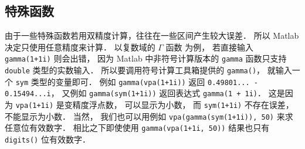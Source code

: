 \subsection{特殊函数}
由于一些特殊函数若用双精度计算，往往在一些区间产生较大误差． 所以 Matlab 决定只使用任意精度来计算． 以复数域的 $\Gamma$ 函数 为例， 若直接输入 \verb|gamma(1+1i)| 则会出错， 因为 Matlab 中非符号计算版本的 \verb|gamma| 函数只支持 \verb|double| 类型的实数输入． 所以要调用符号计算工具箱提供的 \verb|gamma()|， 就输入一个 \verb|sym| 类型的变量即可． 例如 \verb|gamma(vpa(1+1i))| 返回 \verb|0.49801... - 0.15494...i|， 又例如 \verb|gamma(sym(1+1i))| 返回表达式 \verb|gamma(1 + 1i)|． 这是因为 \verb|vpa(1+1i)| 是变精度浮点数， 可以显示为小数， 而 \verb|sym(1+1i)| 不存在误差， 不能显示为小数． 当然， 我们也可以用例如 \verb|vpa(gamma(sym(1+1i)), 50)| 来求任意位有效数字． 相比之下即使使用 \verb|gamma(vpa(1+1i, 50))| 结果也只有 \verb|digits()| 位有效数字．
